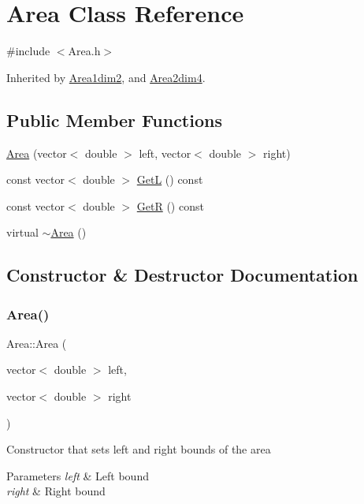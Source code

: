 \hypertarget{class_area}{}\section{Area Class Reference}
\label{class_area}


{\ttfamily \#include $<$Area.\+h$>$}



Inherited by \hyperlink{class_area1dim2}{Area1dim2}, and \hyperlink{class_area2dim4}{Area2dim4}.

\subsection*{Public Member Functions}
\begin{DoxyCompactItemize}
\item 
\hyperlink{class_area_ac591bc277cba5d98a887830c062b54bc}{Area} (vector$<$ double $>$ left, vector$<$ double $>$ right)
\item 
const vector$<$ double $>$ \hyperlink{class_area_a0b98386a2a143eee41264b2db59b26b3}{GetL} () const
\item 
const vector$<$ double $>$ \hyperlink{class_area_a0aeda5ae66e32e7f75bb47bc4886f27a}{GetR} () const
\item 
virtual \hyperlink{class_area_ace0975982b61a16746c564a0d43a4cc8}{$\sim$\+Area} ()
\end{DoxyCompactItemize}


\subsection{Constructor \& Destructor Documentation}
\mbox{\label{class_area_ac591bc277cba5d98a887830c062b54bc}} 
\subsubsection{\texorpdfstring{Area()}{Area()}}
{\footnotesize\ttfamily Area\+::\+Area (\begin{DoxyParamCaption}\item[{vector$<$ double $>$}]{left,  }\item[{vector$<$ double $>$}]{right }\end{DoxyParamCaption})\hspace{0.3cm}{\ttfamily [inline]}}

Constructor that sets left and right bounds of the area 
\begin{DoxyParams}{Parameters}
{\em left} & Left bound \\
\hline
{\em right} & Right bound \\
\hline
\end{DoxyParams}
\mbox{\label{class_area_ace0975982b61a16746c564a0d43a4cc8}} 

